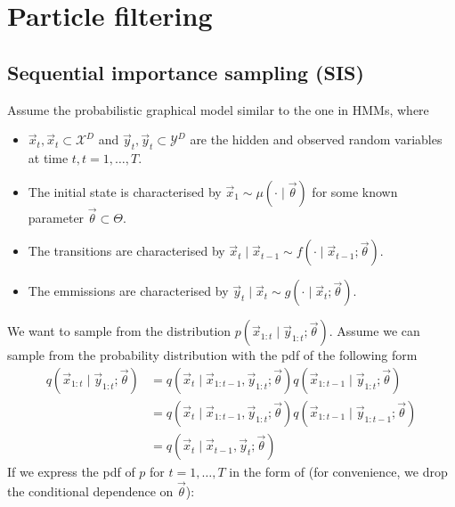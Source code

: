 \section{Particle filtering}
\subsection{Sequential importance sampling (SIS)}
    Assume the probabilistic graphical model similar to the one in HMMs, where
    \begin{itemize}
        \item $\vec x_t, \vec x_t \subset \mathcal X^D$ and $\vec y_t, \vec y_t \subset \mathcal Y^D$ are the hidden and observed random variables at time $t, t = 1, \dotsc, T$.
        \item The initial state is characterised by $\vec x_1 \sim \mu(\cdot \mid \vec \theta)$ for some known parameter $\vec \theta \subset \Theta$.
        \item The transitions are characterised by $\vec x_t \mid \vec x_{t - 1} \sim f(\cdot \mid \vec x_{t - 1}; \vec \theta )$.
        \item The emmissions are characterised by $\vec y_t \mid \vec x_t \sim g(\cdot \mid \vec x_t; \vec \theta )$.
    \end{itemize}
    We want to sample from the distribution $p(\vec x_{1:t} \mid \vec y_{1:t}; \vec \theta)$. Assume we can sample from the probability distribution with the pdf of the following form
    \begin{align}
        q(\vec x_{1:t} \mid \vec y_{1:t}; \vec \theta)  &= q(\vec x_t \mid \vec x_{1:t - 1}, \vec y_{1:t}; \vec \theta) q(\vec x_{1:t-1} \mid \vec y_{1:t}; \vec \theta) \\
                                                        &= q(\vec x_t \mid \vec x_{1:t - 1}, \vec y_{1:t}; \vec \theta) q(\vec x_{1:t-1} \mid \vec y_{1:t - 1}; \vec \theta) \\
                                                        &= q(\vec x_t \mid \vec x_{t - 1}, \vec y_t; \vec \theta)
    \end{align}
    If we express the pdf of $p$ for $t = 1, \dotsc, T$ in the form of (for convenience, we drop the conditional dependence on $\vec \theta$):
